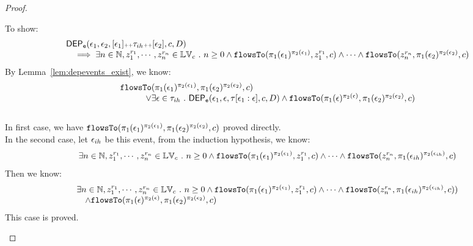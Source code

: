 \begin{proof}
\begin{case}
        To show:
        \[
          \begin{array}{l}
            \mathsf{DEP_{\mathtt{e}}}(\mathtt{\epsilon}_1, \mathtt{\epsilon}_2, [\mathtt{\epsilon}_1] {\scriptscriptstyle ++} \mathtt{\tau}_{ih} {\scriptscriptstyle ++} [\mathtt{\epsilon}_2], c, D) 
          \\ \quad 
          \implies 
          \exists n \in \mathbb{N}, z_1^{r_1}, \cdots, z_n^{r_n} \in \mathbb{LV}_{{c}} ~.~ n \geq 0 \land
          \mathtt{flowsTo}(\pi_1(\mathtt{\epsilon}_1)^{\pi_2(\mathtt{\epsilon}_1)},  z_1^{r_1}, c) 
          \land \cdots \land \mathtt{flowsTo}(z_n^{r_n}, \pi_1(\mathtt{\epsilon}_2)^{\pi_2(\mathtt{\epsilon}_2)}, c) 
        \end{array}
        \]
        By Lemma~\ref{lem:depevents_exist}, we know:
        \[
          \begin{array}{l}
            \mathtt{flowsTo}(\pi_1(\mathtt{\epsilon}_1)^{\pi_2(\mathtt{\epsilon}_1)}, \pi_1(\mathtt{\epsilon}_2)^{\pi_2(\mathtt{\epsilon}_2)}, c) 
        \\ \qquad \quad \lor
        \exists \mathtt{\epsilon} \in \mathtt{\tau}_{ih} ~.~ 
          \mathsf{DEP_{\mathtt{e}}}(\mathtt{\epsilon}_1, \mathtt{\epsilon}, \mathtt{\tau}[\mathtt{\epsilon}_1:\mathtt{\epsilon}], c, D)
        \land 
        \mathtt{flowsTo}(\pi_1(\mathtt{\epsilon})^{\pi_2(\mathtt{\epsilon})}, \pi_1(\mathtt{\epsilon}_2)^{\pi_2(\mathtt{\epsilon}_2)}, c) 
      \end{array}
      \]
        \\
        In first case, we have $\mathtt{flowsTo}(\pi_1(\mathtt{\epsilon}_1)^{\pi_2(\mathtt{\epsilon}_1)}, \pi_1(\mathtt{\epsilon}_2)^{\pi_2(\mathtt{\epsilon}_2)}, c) $ proved directly.
        \\
        In the second case, let $\mathtt{\epsilon}_{ih}$ be this event, from the induction hypothesis, we know:
        \[
          \exists n \in \mathbb{N}, z_1^{r_1}, \cdots, z_n^{r_n} \in \mathbb{LV}_{{c}} ~.~ n \geq 0 \land
            \mathtt{flowsTo}(\pi_1(\mathtt{\epsilon}_1)^{\pi_2(\mathtt{\epsilon}_1)},  z_1^{r_1}, c) 
            \land \cdots \land \mathtt{flowsTo}(z_n^{r_n}, \pi_1(\mathtt{\epsilon}_{ih})^{\pi_2(\mathtt{\epsilon}_{ih})}, c) 
          \]
          Then we know:
          \[
            \begin{array}{l}
              \exists n \in \mathbb{N}, z_1^{r_1}, \cdots, z_n^{r_n} \in \mathbb{LV}_{{c}} ~.~ n \geq 0 \land
            \mathtt{flowsTo}(\pi_1(\mathtt{\epsilon}_1)^{\pi_2(\mathtt{\epsilon}_1)},  z_1^{r_1}, c) 
            \land \cdots \land \mathtt{flowsTo}(z_n^{r_n}, \pi_1(\mathtt{\epsilon}_{ih})^{\pi_2(\mathtt{\epsilon}_{ih})}, c) )
             \\ \quad  
             \land  \mathtt{flowsTo}(\pi_1(\mathtt{\epsilon})^{\pi_2(\mathtt{\epsilon})}, \pi_1(\mathtt{\epsilon}_2)^{\pi_2(\mathtt{\epsilon}_2)}, c) 
            \end{array}
            \]
            This case is proved.
      \end{case}

\end{proof}
